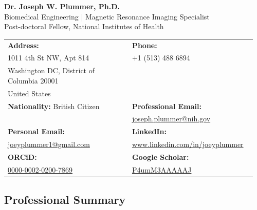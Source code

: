 \documentclass[11pt,]{scrartcl}
\date{}
\begin{document}
\begin{center}
{\Huge \textbf{Dr. Joseph W. Plummer, Ph.D.}}\\[0.3em]
{\large Biomedical Engineering | Magnetic Resonance Imaging Specialist}\\[0.2em]
{\large Post-doctoral Fellow, National Institutes of Health}
\end{center}

\vspace{0.3cm}

\begin{table}[h]
\centering %
{\def\arraystretch{1.2}\tabcolsep=8pt %
\begin{tabular}{p{0.48\linewidth}p{0.48\linewidth}}
  
  \textbf{Address:} & \textbf{Phone:} \\
  1011 4th St NW, Apt 814 & +1 (513) 488 6894 \\
  Washington DC, District of Columbia 20001 & \\
  United States & \\
  
  \textbf{Nationality:} British Citizen & \textbf{Professional Email:} \\
   & \href{mailto:joseph.plummer@nih.gov}{joseph.plummer@nih.gov} \\
  
  \textbf{Personal Email:} & \textbf{LinkedIn:} \\
  \href{mailto:joeyplummer1@gmail.com}{joeyplummer1@gmail.com} & \url{www.linkedin.com/in/joeyplummer} \\
  
  \textbf{ORCiD:} & \textbf{Google Scholar:} \\
  \href{https://orcid.org/0000-0002-0200-7869}{0000-0002-0200-7869} & \href{https://scholar.google.com/citations?user=P4umM3AAAAAJ}{P4umM3AAAAAJ} \\

\end{tabular}%
}
\end{table}

\vspace{-0.2cm}

\subsection{Professional Summary}
\end{document}
